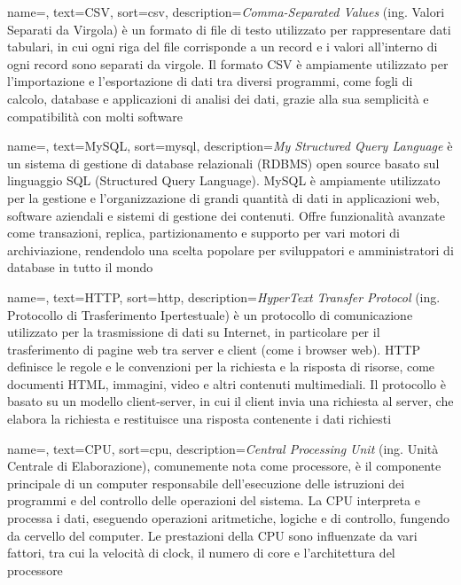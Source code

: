  {
    name=,
    text=CSV,
    sort=csv,
    description={\emph{Comma-Separated Values} (ing. Valori Separati da Virgola) è un formato di file di testo utilizzato per rappresentare dati tabulari, in cui ogni riga del file corrisponde a un record e i valori all'interno di ogni record sono separati da virgole. Il formato CSV è ampiamente utilizzato per l'importazione e l'esportazione di dati tra diversi programmi, come fogli di calcolo, database e applicazioni di analisi dei dati, grazie alla sua semplicità e compatibilità con molti software}
}

 {
    name=,
    text=MySQL,
    sort=mysql,
    description={\emph{My Structured Query Language} è un sistema di gestione di database relazionali (RDBMS) open source basato sul linguaggio SQL (Structured Query Language). MySQL è ampiamente utilizzato per la gestione e l'organizzazione di grandi quantità di dati in applicazioni web, software aziendali e sistemi di gestione dei contenuti. Offre funzionalità avanzate come transazioni, replica, partizionamento e supporto per vari motori di archiviazione, rendendolo una scelta popolare per sviluppatori e amministratori di database in tutto il mondo}
}

 {
    name=,
    text=HTTP,
    sort=http,
    description={\emph{HyperText Transfer Protocol} (ing. Protocollo di Trasferimento Ipertestuale) è un protocollo di comunicazione utilizzato per la trasmissione di dati su Internet, in particolare per il trasferimento di pagine web tra server e client (come i browser web). HTTP definisce le regole e le convenzioni per la richiesta e la risposta di risorse, come documenti HTML, immagini, video e altri contenuti multimediali. Il protocollo è basato su un modello client-server, in cui il client invia una richiesta al server, che elabora la richiesta e restituisce una risposta contenente i dati richiesti}
}

 {
    name=,
    text=CPU,
    sort=cpu,
    description={\emph{Central Processing Unit} (ing. Unità Centrale di Elaborazione), comunemente nota come processore, è il componente principale di un computer responsabile dell'esecuzione delle istruzioni dei programmi e del controllo delle operazioni del sistema. La CPU interpreta e processa i dati, eseguendo operazioni aritmetiche, logiche e di controllo, fungendo da cervello del computer. Le prestazioni della CPU sono influenzate da vari fattori, tra cui la velocità di clock, il numero di core e l'architettura del processore}
}

